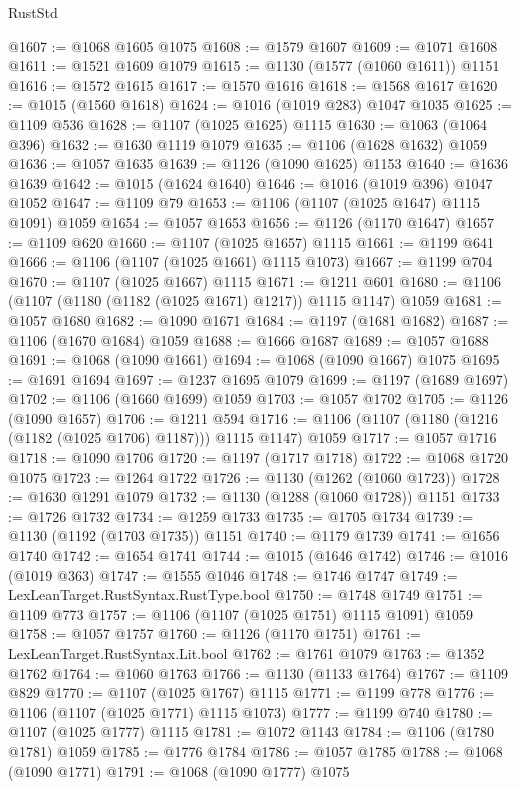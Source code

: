 \begin{lexlean}{RustStd}
\begin{coremodule}
@1607 := @1068 @1605 @1075
@1608 := @1579 @1607
@1609 := @1071 @1608
@1611 := @1521 @1609 @1079
@1615 := @1130 (@1577 (@1060 @1611)) @1151
@1616 := @1572 @1615
@1617 := @1570 @1616
@1618 := @1568 @1617
@1620 := @1015 (@1560 @1618)
@1624 := @1016 (@1019 @283) @1047 @1035
@1625 := @1109 @536
@1628 := @1107 (@1025 @1625) @1115
@1630 := @1063 (@1064 @396)
@1632 := @1630 @1119 @1079
@1635 := @1106 (@1628 @1632) @1059
@1636 := @1057 @1635
@1639 := @1126 (@1090 @1625) @1153
@1640 := @1636 @1639
@1642 := @1015 (@1624 @1640)
@1646 := @1016 (@1019 @396) @1047 @1052
@1647 := @1109 @79
@1653 := @1106 (@1107 (@1025 @1647) @1115 @1091) @1059
@1654 := @1057 @1653
@1656 := @1126 (@1170 @1647)
@1657 := @1109 @620
@1660 := @1107 (@1025 @1657) @1115
@1661 := @1199 @641
@1666 := @1106 (@1107 (@1025 @1661) @1115 @1073)
@1667 := @1199 @704
@1670 := @1107 (@1025 @1667) @1115
@1671 := @1211 @601
@1680 := @1106 (@1107 (@1180 (@1182 (@1025 @1671) @1217)) @1115 @1147) @1059
@1681 := @1057 @1680
@1682 := @1090 @1671
@1684 := @1197 (@1681 @1682)
@1687 := @1106 (@1670 @1684) @1059
@1688 := @1666 @1687
@1689 := @1057 @1688
@1691 := @1068 (@1090 @1661)
@1694 := @1068 (@1090 @1667) @1075
@1695 := @1691 @1694
@1697 := @1237 @1695 @1079
@1699 := @1197 (@1689 @1697)
@1702 := @1106 (@1660 @1699) @1059
@1703 := @1057 @1702
@1705 := @1126 (@1090 @1657)
@1706 := @1211 @594
@1716 := @1106 (@1107 (@1180 (@1216 (@1182 (@1025 @1706) @1187))) @1115 @1147) @1059
@1717 := @1057 @1716
@1718 := @1090 @1706
@1720 := @1197 (@1717 @1718)
@1722 := @1068 @1720 @1075
@1723 := @1264 @1722
@1726 := @1130 (@1262 (@1060 @1723))
@1728 := @1630 @1291 @1079
@1732 := @1130 (@1288 (@1060 @1728)) @1151
@1733 := @1726 @1732
@1734 := @1259 @1733
@1735 := @1705 @1734
@1739 := @1130 (@1192 (@1703 @1735)) @1151
@1740 := @1179 @1739
@1741 := @1656 @1740
@1742 := @1654 @1741
@1744 := @1015 (@1646 @1742)
@1746 := @1016 (@1019 @363)
@1747 := @1555 @1046
@1748 := @1746 @1747
@1749 := LexLeanTarget.RustSyntax.RustType.bool
@1750 := @1748 @1749
@1751 := @1109 @773
@1757 := @1106 (@1107 (@1025 @1751) @1115 @1091) @1059
@1758 := @1057 @1757
@1760 := @1126 (@1170 @1751)
@1761 := LexLeanTarget.RustSyntax.Lit.bool
@1762 := @1761 @1079
@1763 := @1352 @1762
@1764 := @1060 @1763
@1766 := @1130 (@1133 @1764)
@1767 := @1109 @829
@1770 := @1107 (@1025 @1767) @1115
@1771 := @1199 @778
@1776 := @1106 (@1107 (@1025 @1771) @1115 @1073)
@1777 := @1199 @740
@1780 := @1107 (@1025 @1777) @1115
@1781 := @1072 @1143
@1784 := @1106 (@1780 @1781) @1059
@1785 := @1776 @1784
@1786 := @1057 @1785
@1788 := @1068 (@1090 @1771)
@1791 := @1068 (@1090 @1777) @1075

\end{coremodule}
\end{lexlean}
